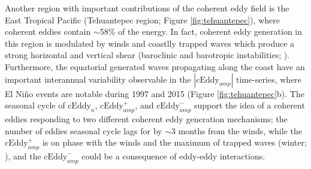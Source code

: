 \documentclass[draft,linenumbers]{agujournal2019}
\newcommand{\cEddy}{\textrm{cEddy}}
\begin{document}

	Another region with important contributions of the coherent eddy field is the East Tropical Pacific (Tehuantepec region; Figure \ref{fig:tehuantepec}), where coherent eddies contain $\sim$58\% of the energy. 
	In fact, coherent eddy generation in this region is modulated by winds and coastlly trapped waves which produce a strong horizontal and vertical shear (baroclinic and barotropic instabilities; \citealp{Zamudio_Tehuantepec_2006}). 
	Furthermore, the equatorial generated waves propagating along the coast have an important interannual variability observable in the $|\cEddy_{amp}|$ time-series, where El Niño events are notable during 1997 and 2015 (Figure \ref{fig:tehuantepec}b). 
	The seasonal cycle of $\cEddy_{n}$, $\cEddy_{amp}^+$, and $\cEddy_{amp}^-$ support the idea of a coherent eddies responding to two different coherent eddy generation mechanisms; the number of eddies seasonal cycle lags for by $\sim$3 months from the winds, while the $\cEddy_{amp}^+$ is on phase with the winds and the maximum of trapped waves (winter; \citealp{Zamudio_Tehuantepec_2006}), and the $\cEddy_{amp}^-$ could be a consequence of eddy-eddy interactions. 

\end{document}
